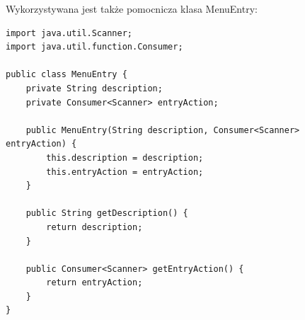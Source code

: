 \documentclass[12pt, a4paper]{mwart}
\begin{document}
Wykorzystywana jest także pomocnicza klasa MenuEntry:

\begin{lstlisting}
import java.util.Scanner;
import java.util.function.Consumer;

public class MenuEntry {
    private String description;
    private Consumer<Scanner> entryAction;

    public MenuEntry(String description, Consumer<Scanner> entryAction) {
        this.description = description;
        this.entryAction = entryAction;
    }

    public String getDescription() {
        return description;
    }

    public Consumer<Scanner> getEntryAction() {
        return entryAction;
    }
}
\end{lstlisting}
\end{document}
